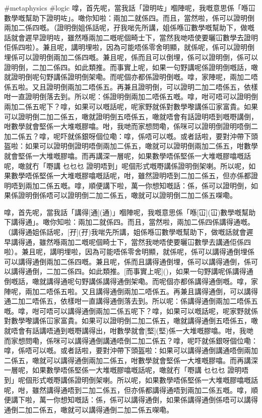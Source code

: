 #metaphysics #logic
嗱，首先呢，當我話「證明咗」嗰陣呢，我嘅意思係「喺冚數學嘅幫助下證明咗」。噉你知啦：兩加二就係四。而且，當然啦，係可以證明倒兩加二係四嘅。（證明倒姐係話呢，孖我啱先所講，姐係喺冚數學嘅幫助下，做嘅話就會遲早證明咗，雖然喺兩加二嘅呢個畸士下，當然我哋唔使要曬冚數學去證明佢係四啦）。兼且呢，講明埋啦，因為可能唔係零舍明顯，就係呢，係可以證明倒埋係可以證明倒兩加二係四嘅。兼且呢，係而且可以倒埋，係可以證明倒，係可以證明倒，二加二係四。如此類推。而事實上呢，如果一句野講呢係證明倒嘅話，噉就證明倒呢句野講係證明倒架嘞。而呢個亦都係證明倒嘅。嗱，家陣呢，兩加二唔係五啦。又且證明倒兩加二唔係五。再兼且證明倒，可以證明二加二唔係五，依樣咁一直證明倒落去到。所以呢：係證明倒兩加二唔係五嘅。嗱，咁可唔可以證明倒兩加二係五呢下？嗱，如果可以嘅話呢，呢家野就係對數學嚟講係冚家富貴。如果可以證明倒二加二係五，噉就證明倒五唔係五，噉就唔會有話證明唔到嘅嘢講倒，咁數學就會堅係一大堆嘅膠噏。咁，我哋而家想問嘞，係咪可以證明倒證明唔倒二加二係五？嗱，呢吓就係銀呀個位嘞：嗱，係唔可以嘅。或者話啦，要對沖帶下頭盔啦：如果可以證明倒證明唔倒兩加二係五，噉就可以證明倒兩加二係五，咁數學就會堅係一大堆嘅膠噏。而再講深一層呢，如果數學唔係堅係一大堆嘅膠噏嘅話呢，噉就冇「嘢講 乜乜乜 證明唔到」呢個形式嘅嘢講係證明倒架喇。所以呢，如果數學唔係堅係一大堆嘅膠噏嘅話呢，咁，雖然證明唔到二加二係五，但亦係都證明唔到兩加二係五嘅。嗱，順便講下啦，萬一你想知嘅話：係，係可以證明倒，如果係證明倒係唔可以證明倒二加二係五，噉就可以證明倒二加二係五㗎嘞。


嗱，首先呢，當我話「講得[通](通)」嗰陣呢，我嘅意思係「喺[冚](冚)數學嘅幫助下講得通」。噉你知啦：兩加二就係四。而且，當然啦，兩加二係四係講得通嘅。（講得通姐係話呢，[孖](孖)我啱先所講，姐係喺冚數學嘅幫助下，做嘅話就會遲早講得通，雖然喺兩加二嘅呢個畸士下，當然我哋唔使要曬冚數學去講通佢係四啦）。兼且呢，講明埋啦，因為可能唔係零舍明顯，就係呢，係可以講得通倒埋係可以講得通倒兩加二係四嘅。兼且呢，係而且講得通倒埋，係可以講得通倒，係可以講得通倒，二加二係四。如此類推。[而事實上呢]()，如果一句野講呢係講得通倒嘅話，噉就講得通呢句野講係講得通倒架嘞。而呢個亦都係講得通倒嘅。嗱，家陣呢，兩加二唔係五啦。又且講得通倒兩加二唔係五。再兼且講得通倒，可以講得通二加二唔係五，依樣咁一直講得通倒落去到。所以呢：係講得通倒兩加二唔係五嘅。嗱，咁可唔可以講得通倒兩加二係五呢下？嗱，如果可以嘅話呢，呢家野就係對數學嚟講係冚家富貴。如果可以證明倒二加二係五，噉就講得通倒五唔係五，噉就唔會有話講唔通到嘅嘢講得出，咁數學就會[堅](堅)係一大堆嘅膠噏。咁，我哋而家想問嘞，係咪可以講得通倒講通唔倒二加二係五？嗱，呢吓就係銀呀個位嘞：嗱，係唔可以嘅。或者話啦，要對沖帶下頭盔啦：如果可以講得通倒講通唔倒兩加二係五，噉就可以講得通倒兩加二係五，咁數學就會堅係一大堆嘅膠噏。而再講深一層呢，如果數學唔係堅係一大堆嘅膠噏嘅話呢，噉就冇「嘢講 乜乜乜 證明唔到」呢個形式嘅嘢講係證明倒架喇。所以呢，如果數學唔係堅係一大堆嘅膠噏嘅話呢，咁，雖然講得通唔到二加二係五，但亦係都講得通唔到兩加二係五嘅。嗱，順便講下啦，萬一你想知嘅話：係，係可以講得通倒，如果係講得通倒係唔可以講得通倒二加二係五，噉就可以講得通倒二加二係五㗎嘞。